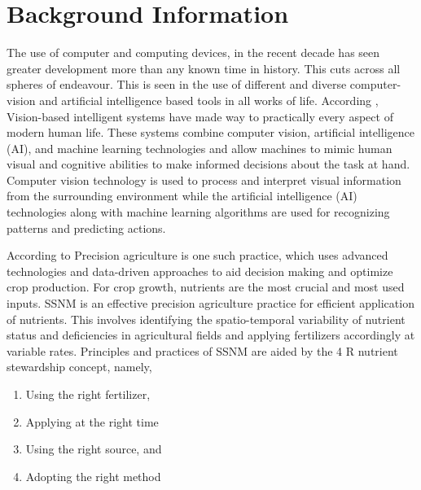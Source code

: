 \section{Background Information}
The use of computer and computing devices, in the recent decade has seen greater development more than any known time in history. This cuts across all spheres of endeavour. This is seen in the use of different and diverse computer-vision and artificial intelligence based tools in all works of life. According
\citep{ghazalComputerVisionSmart2024}, Vision-based intelligent systems have made way to practically every aspect of modern human life. These systems combine computer vision, artificial intelligence (AI), and machine learning technologies and allow machines to mimic human visual and cognitive abilities to make informed decisions about the task at hand. Computer vision technology is used to process and interpret visual information from the surrounding environment while the artificial intelligence (AI) technologies along with machine learning algorithms are used for recognizing patterns and predicting actions.

According to \citep{VULLAGANTI2025147} Precision agriculture is one such practice, which uses advanced technologies and data-driven approaches to aid decision making and optimize crop production. For crop growth, nutrients are the most crucial and most used inputs. SSNM is an effective precision agriculture practice for efficient application of nutrients. This involves identifying the spatio-temporal variability of nutrient status and deficiencies in agricultural fields and applying fertilizers accordingly at variable rates. Principles and practices of SSNM are aided by the 4 R nutrient stewardship concept, namely, 
\begin{enumerate}
	\item Using the right fertilizer,
	\item Applying at the right time
	\item Using the right source, and 
	\item Adopting the right method
\end{enumerate}

